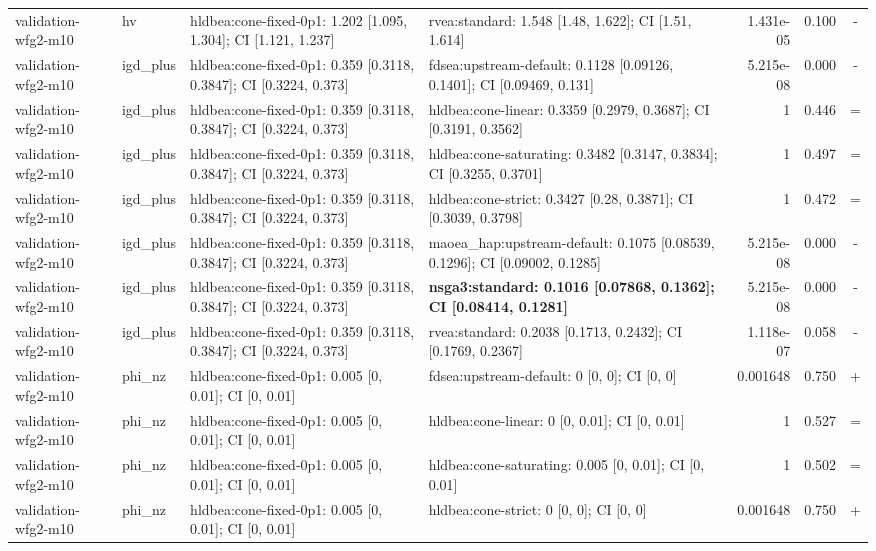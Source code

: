 \begin{tabular}{llllrrc}
validation-wfg2-m10 & hv & hldbea:cone-fixed-0p1: 1.202 [1.095, 1.304]; CI [1.121, 1.237] & rvea:standard: 1.548 [1.48, 1.622]; CI [1.51, 1.614] & 1.431e-05 & 0.100 & - \\
validation-wfg2-m10 & igd\_plus & hldbea:cone-fixed-0p1: 0.359 [0.3118, 0.3847]; CI [0.3224, 0.373] & fdsea:upstream-default: 0.1128 [0.09126, 0.1401]; CI [0.09469, 0.131] & 5.215e-08 & 0.000 & - \\
validation-wfg2-m10 & igd\_plus & hldbea:cone-fixed-0p1: 0.359 [0.3118, 0.3847]; CI [0.3224, 0.373] & hldbea:cone-linear: 0.3359 [0.2979, 0.3687]; CI [0.3191, 0.3562] & 1 & 0.446 & = \\
validation-wfg2-m10 & igd\_plus & hldbea:cone-fixed-0p1: 0.359 [0.3118, 0.3847]; CI [0.3224, 0.373] & hldbea:cone-saturating: 0.3482 [0.3147, 0.3834]; CI [0.3255, 0.3701] & 1 & 0.497 & = \\
validation-wfg2-m10 & igd\_plus & hldbea:cone-fixed-0p1: 0.359 [0.3118, 0.3847]; CI [0.3224, 0.373] & hldbea:cone-strict: 0.3427 [0.28, 0.3871]; CI [0.3039, 0.3798] & 1 & 0.472 & = \\
validation-wfg2-m10 & igd\_plus & hldbea:cone-fixed-0p1: 0.359 [0.3118, 0.3847]; CI [0.3224, 0.373] & maoea\_hap:upstream-default: 0.1075 [0.08539, 0.1296]; CI [0.09002, 0.1285] & 5.215e-08 & 0.000 & - \\
validation-wfg2-m10 & igd\_plus & hldbea:cone-fixed-0p1: 0.359 [0.3118, 0.3847]; CI [0.3224, 0.373] & \textbf{nsga3:standard: 0.1016 [0.07868, 0.1362]; CI [0.08414, 0.1281]} & 5.215e-08 & 0.000 & - \\
validation-wfg2-m10 & igd\_plus & hldbea:cone-fixed-0p1: 0.359 [0.3118, 0.3847]; CI [0.3224, 0.373] & rvea:standard: 0.2038 [0.1713, 0.2432]; CI [0.1769, 0.2367] & 1.118e-07 & 0.058 & - \\
validation-wfg2-m10 & phi\_nz & hldbea:cone-fixed-0p1: 0.005 [0, 0.01]; CI [0, 0.01] & fdsea:upstream-default: 0 [0, 0]; CI [0, 0] & 0.001648 & 0.750 & + \\
validation-wfg2-m10 & phi\_nz & hldbea:cone-fixed-0p1: 0.005 [0, 0.01]; CI [0, 0.01] & hldbea:cone-linear: 0 [0, 0.01]; CI [0, 0.01] & 1 & 0.527 & = \\
validation-wfg2-m10 & phi\_nz & hldbea:cone-fixed-0p1: 0.005 [0, 0.01]; CI [0, 0.01] & hldbea:cone-saturating: 0.005 [0, 0.01]; CI [0, 0.01] & 1 & 0.502 & = \\
validation-wfg2-m10 & phi\_nz & hldbea:cone-fixed-0p1: 0.005 [0, 0.01]; CI [0, 0.01] & hldbea:cone-strict: 0 [0, 0]; CI [0, 0] & 0.001648 & 0.750 & + \\

\end{tabular}
